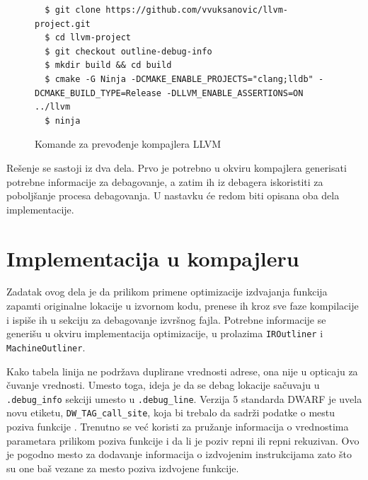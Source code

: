 \documentclass[12pt,oneside]{memoir}
\begin{document}
\begin{figure}[!ht]
\begin{verbatim}
  $ git clone https://github.com/vvuksanovic/llvm-project.git
  $ cd llvm-project
  $ git checkout outline-debug-info
  $ mkdir build && cd build
  $ cmake -G Ninja -DCMAKE_ENABLE_PROJECTS="clang;lldb" -DCMAKE_BUILD_TYPE=Release -DLLVM_ENABLE_ASSERTIONS=ON ../llvm
  $ ninja
\end{verbatim}
\caption{Komande za prevođenje kompajlera LLVM}
\label{lst:llvm_compile_commands}
\end{figure}

Rešenje se sastoji iz dva dela.
Prvo je potrebno u okviru kompajlera generisati potrebne informacije za debagovanje, a zatim ih iz debagera iskoristiti za poboljšanje procesa debagovanja.
U nastavku će redom biti opisana oba dela implementacije.

\section{Implementacija u kompajleru}


Zadatak ovog dela je da prilikom primene optimizacije izdvajanja funkcija zapamti originalne lokacije u izvornom kodu, prenese ih kroz sve faze kompilacije i ispiše ih u sekciju za debagovanje izvršnog fajla.
Potrebne informacije se generišu u okviru implementacija optimizacije, u prolazima \verb|IROutliner| i \verb|MachineOutliner|.

Kako tabela linija ne podržava duplirane vrednosti adrese, ona nije u opticaju za čuvanje vrednosti.
Umesto toga, ideja je da se debag lokacije sačuvaju u \verb|.debug_info| sekciji umesto u \verb|.debug_line|.
Verzija 5 standarda DWARF je uvela novu etiketu, \verb|DW_TAG_call_site|, koja bi trebalo da sadrži podatke o mestu poziva funkcije \cite{jelinek2010callsite}.
Trenutno se već koristi za pružanje informacija o vrednostima parametara prilikom poziva funkcije \cite{jelinek2010entryvalue} i da li je poziv repni ili repni rekuzivan. %
Ovo je pogodno mesto za dodavanje informacija o izdvojenim instrukcijama zato što su one baš vezane za mesto poziva izdvojene funkcije.
\end{document}
